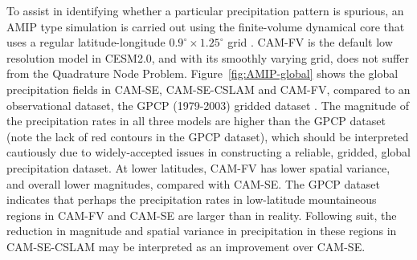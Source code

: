 \documentclass[twocol]{ametsoc}
\begin{document}
{\color{red}To assist in identifying whether a particular precipitation pattern is spurious, an AMIP type simulation is carried out using the finite-volume dynamical core that uses a regular latitude-longitude $0.9^{\circ}\times 1.25^\circ$ grid \citep[CAM-FV;][]{CAM5}. CAM-FV is the default low resolution model in CESM2.0, and with its smoothly varying grid, does not suffer from the Quadrature Node Problem. Figure~\ref{fig:AMIP-global} shows the global precipitation fields in CAM-SE, CAM-SE-CSLAM and CAM-FV, compared to an observational dataset, the GPCP (1979-2003) gridded dataset \citep{H2001JH}. The magnitude of the precipitation rates in all three models are higher than the GPCP dataset (note the lack of red contours in the GPCP dataset), which should be interpreted cautiously due to widely-accepted issues in constructing a reliable, gridded, global precipitation dataset. At lower latitudes, CAM-FV has lower spatial variance, and overall lower magnitudes, compared with CAM-SE. The GPCP dataset indicates that perhaps the precipitation rates in low-latitude mountaineous regions in CAM-FV and CAM-SE are larger than in reality. Following suit, the reduction in magnitude and spatial variance in precipitation in these regions in CAM-SE-CSLAM may be interpreted as an improvement over CAM-SE.{}} 
\end{document}
